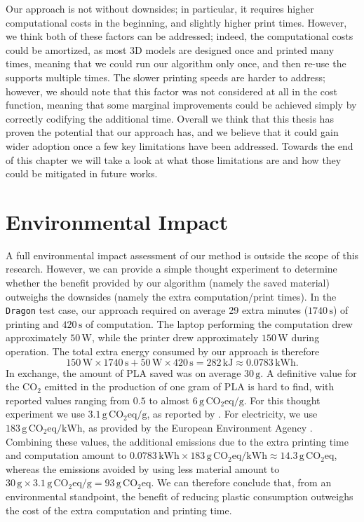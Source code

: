 Our approach is not without downsides; in particular, it requires higher computational
costs in the beginning, and slightly higher print times. However, we think both of these
factors can be addressed; indeed, the computational costs could be amortized, as most 3D models
are designed once and printed many times, meaning that we could run our algorithm only once, and then
re-use the supports multiple times. The slower printing speeds are harder to address; however,
we should note that this factor was not considered at all in the cost function, meaning that
some marginal improvements could be achieved simply by correctly codifying the additional time.
Overall we think that this thesis has proven the potential that our approach has,
and we believe that it could gain wider adoption once a few key limitations have been addressed.
Towards the end of this chapter we will take a look at what those limitations are and
how they could be mitigated in future works.

\section{Environmental Impact}

A full environmental impact assessment of our method is outside the scope of this
research. However, we can provide a simple thought experiment to determine whether
the benefit provided by our algorithm (namely the saved material) outweighs the downsides
(namely the extra computation/print times).
In the \texttt{Dragon} test case, our approach required on average 29 extra minutes
($1740\,\mathrm{s}$) of printing and $420\,\mathrm{s}$ of computation. The laptop
performing the computation drew approximately $50\,\mathrm{W}$, while the printer
drew approximately $150\,\mathrm{W}$ during operation. The total extra energy
consumed by our approach is therefore
\[
150\,\mathrm{W} \times 1740\,\mathrm{s} + 50\,\mathrm{W} \times 420\,\mathrm{s}
= 282\,\mathrm{kJ} \approx 0.0783\,\mathrm{kWh}.
\]
In exchange, the amount of PLA saved was on average $30\,\mathrm{g}$.
A definitive value for the $\mathrm{CO_2}$ emitted in the production of one gram of
PLA is hard to find, with reported values ranging from $0.5$ to almost
$6\,\mathrm{g\,CO_2eq/g}$. For this thought experiment we use $3.1\,\mathrm{g\,CO_2eq/g}$,
as reported by \cite{ENAREVBA2025267}. For electricity, we use
$183\,\mathrm{g\,CO_2eq/kWh}$, as provided by the European Environment Agency
\cite{electricity_emissions}.
Combining these values, the additional emissions due to the extra printing time and
computation amount to
$0.0783\,\mathrm{kWh} \times 183\,\mathrm{g\,CO_2eq/kWh} \approx 14.3\,\mathrm{g\,CO_2eq}$,
whereas the emissions avoided by using less material amount to
$30\,\mathrm{g} \times 3.1\,\mathrm{g\,CO_2eq/g} = 93\,\mathrm{g\,CO_2eq}$.
We can therefore conclude that, from an environmental standpoint, the benefit of
reducing plastic consumption outweighs the cost of the extra computation and
printing time.



